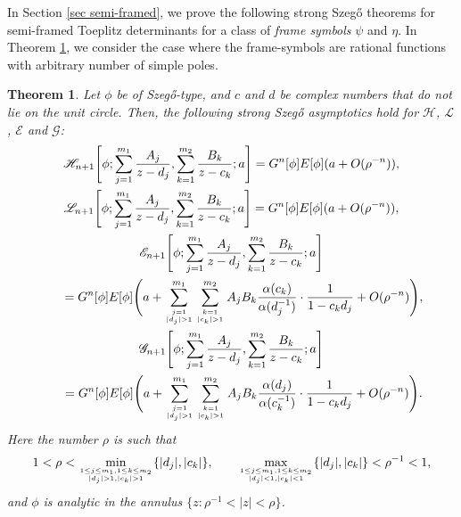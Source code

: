 \documentclass[pdftex]{sigma}
\numberwithin{equation}{section}
\newtheorem{Theorem}{Theorem}[section]
\newcommand{\al}{\alpha}
\newcommand{\di}{\displaystyle}
\begin{document}
In Section \ref{sec semi-framed}, we prove the following strong Szeg\H{o} theorems for semi-framed Toeplitz determinants for a class of \textit{frame symbols} $\psi$ and $\eta$. In Theorem \ref{thm semi-framed rationals intro}, we consider the case where the frame-symbols are rational functions with arbitrary number of simple poles.
	
	\begin{Theorem}\label{thm semi-framed rationals intro}
		Let $\phi$ be of Szeg\H{o}-type, and $c$ and $d$ be complex numbers that do not lie on the unit circle. Then, the following strong Szeg\H{o} asymptotics hold for $\mathscr{H}$, $\mathscr{L}$, $\mathscr{E}$ and $\mathscr{G}$:
		\begin{gather}
			\mathscr{H}_{n+1}\Bigg[\phi; \di \sum_{j=1}^{m_1} \di \frac{A_j}{z-d_j}, \sum_{k=1}^{m_2} \di \frac{B_k}{z-c_k};a\Bigg] = G^n[\phi] E[\phi] (a + O(\rho^{-n})),\label{asymp H rationals lin comb}	
\\
			\mathscr{L}_{n+1}\Bigg[\phi; \di \sum_{j=1}^{m_1} \di \frac{A_j}{z-d_j}, \sum_{k=1}^{m_2} \di \frac{B_k}{z-c_k};a\Bigg] = G^n[\phi] E[\phi] (a + O(\rho^{-n})),\nonumber	
\\
			\mathscr{E}_{n+1}\Bigg[\phi; \di \sum_{j=1}^{m_1} \di \frac{A_j}{z-d_j}, \sum_{k=1}^{m_2} \di \frac{B_k}{z-c_k};a\Bigg] \nonumber \\
\qquad= G^n[\phi] E[\phi] \Bigg( a + \sum^{m_1}_{j=1 \atop |d_j|>1 } \sum^{m_2}_{k=1 \atop |c_k|>1 } A_jB_k \frac{\al(c_k)}{\al(d_j^{-1})}\cdot \frac{1}{1-c_kd_j} +O(\rho^{-n}) \Bigg),\nonumber	
\\
			\mathscr{G}_{n+1}\Bigg[\phi; \di \sum_{j=1}^{m_1} \di \frac{A_j}{z-d_j}, \sum_{k=1}^{m_2} \di \frac{B_k}{z-c_k};a\Bigg] \nonumber\\
\qquad= G^n[\phi] E[\phi] \Bigg( a + \sum^{m_1}_{j=1 \atop |d_j|>1 } \sum^{m_2}_{k=1 \atop |c_k|>1 } A_jB_k \frac{\al(d_j)}{\al(c_k^{-1})}\cdot \frac{1}{1-c_kd_j} +O(\rho^{-n}) \Bigg).\nonumber
		\end{gather}			
		Here the number $\rho$ is such that
\[1<\rho < \underset{1 \leq j \leq m_1, 1 \leq k \leq m_2 \atop |d_j|>1,|c_k|>1}{\min} \{|d_j|,|c_k|\}, \qquad \underset{1 \leq j \leq m_1, 1 \leq k \leq m_2 \atop |d_j|<1,|c_k|<1}{\max} \{|d_j|,|c_k|\}<\rho^{-1}<1,
\]
 and $\phi$ is analytic in the annulus $\{z\colon \rho^{-1}<|z|<\rho\}$.
	\end{Theorem}
	
\end{document}
